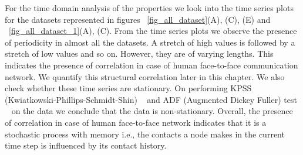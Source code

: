 For the time domain analysis of the properties we look into the time series plots for the datasets represented in figures ~\ref{fig_all_dataset}(A), (C), (E) and 
~\ref{fig_all_dataset_1}(A), (C).
From the time series plots we observe the presence of periodicity in almost all the datasets. A stretch of high values is followed by a stretch of low values 
and so on. However, they are of varying lengths.  
This indicates the presence of correlation in case of human face-to-face communication network.
We quantify this structural correlation later in this chapter. 
We also check whether these time series are stationary. 
On performing KPSS (Kwiatkowski-Phillips-Schmidt-Shin) ~\cite{kwiatkowski1992testing} and 
 ADF (Augmented Dickey Fuller) test ~\cite{dickey1979distribution} on the data we conclude that the data is non-stationary. 
 Overall, the presence of correlation in case of human face-to-face network indicates that it is a stochastic process with memory i.e., the contacts a node 
 makes in the current time step is influenced by its contact history. 
